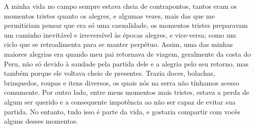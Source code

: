 A minha vida no campo sempre estava cheia de contrapontos, tantos eram os momentos tristes quanto os alegres, e algumas vezes, mais das que me permitiriam pensar que era só uma casualidade, os momentos tristes preparavam um caminho inevitável e irreversível às épocas alegres, e vice-versa; como um ciclo que se retroalimenta para se manter perpétuo. 
Assim, uma das minhas maiores alegrias era quando meu pai retornava de viagem, geralmente da costa do Peru, não só devido à saudade pela partida dele e a alegria pelo seu retorno, mas também porque ele voltava cheio de presentes. Trazia doces, bolachas, brinquedos, roupas e itens diversos, os quais nós na serra não tínhamos acesso comumente.
Por outro lado, entre meus momentos mais tristes, estava a perda de algum ser querido e a consequente impotência ao não ser capaz de evitar sua partida. 
No entanto, tudo isso é parte da vida, e gostaria compartir com vocês alguns desses momentos.



